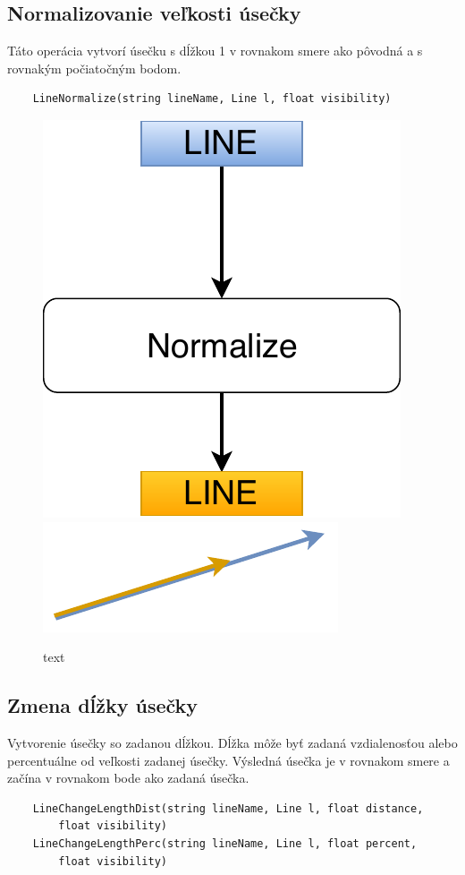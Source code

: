 \subsection{Normalizovanie veľkosti úsečky}
Táto operácia vytvorí úsečku s dĺžkou 1 v rovnakom smere ako pôvodná a s rovnakým počiatočným bodom.
\begin{lstlisting}
	LineNormalize(string lineName, Line l, float visibility)
\end{lstlisting}

\begin{figure}[H]
	\centering
	\includegraphics[height=0.3\textwidth]{obrazky-figures/Diagram/Line/DP Navrh operacii-1D - LineNormalize.pdf}
	\includegraphics[]{obrazky-figures/Diagram/Draw/2Line/DP Navrh operacii-1D - LineNormalize.pdf}
	\caption{text}
	\label{fig:1}
\end{figure}

\subsection{Zmena dĺžky úsečky}
Vytvorenie úsečky so zadanou dĺžkou. Dĺžka môže byť zadaná vzdialenosťou alebo percentuálne od veľkosti zadanej úsečky. Výsledná úsečka je v rovnakom smere a začína v rovnakom bode ako zadaná úsečka.
\begin{lstlisting}
	LineChangeLengthDist(string lineName, Line l, float distance, 
	    float visibility)
	LineChangeLengthPerc(string lineName, Line l, float percent, 
	    float visibility) 
\end{lstlisting}%

